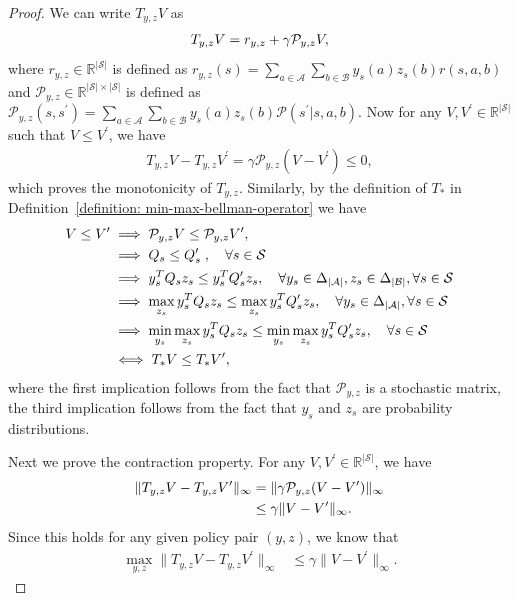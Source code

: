 \documentclass{article}
\theoremstyle{plain}
\theoremstyle{definition}
\theoremstyle{remark}
\def\cA{\mathcal A}
\def\cB{\mathcal B}
\def\cP{\mathcal P}
\begin{document}
\begin{proof}
    We can write $T_{y,z} V$ as
    \begin{align}
        T_{y,z} V = r_{y,z} + \gamma \cP_{y,z} V,\notag
    \end{align}
    where $r_{y,z} \in \mathbb{R}^{|\mathcal{S}|}$ is defined as $r_{y,z}(s) = \sum_{a\in \mathcal{A}} \sum_{b\in \mathcal{B}} y_s(a) z_s(b) r(s,a,b)$ and $\cP_{y,z} \in \mathbb{R}^{|\mathcal{S}| \times |\mathcal{S}|}$ is defined as $\cP_{y,z}(s,s^\prime) = \sum_{a\in \mathcal{A}} \sum_{b\in \mathcal{B}} y_s(a) z_s(b) \cP(s^\prime|s,a,b)$.
    Now for any $V, V^\prime \in \mathbb{R}^{|\mathcal{S}|}$ such that $V \le V^\prime$, we have 
    \begin{align}
        T_{y,z} V - T_{y,z} V^\prime= \gamma \cP_{y,z} (V - V^\prime) \le 0,
    \end{align}
    which proves the monotonicity of $T_{y,z}$.
    Similarly, by the definition of $T_{*}$ in Definition~\ref{definition: min-max-bellman-operator} we have
    \begin{align}
        V \le V^\prime & \implies \cP_{y,z} V \le \cP_{y,z} V^\prime,   \notag\\
        & \implies Q_s \le Q_s^\prime \; , \quad \forall s\in \mathcal{S} \notag\\
        & \implies y_s^T Q_s z_s \le y_s^T Q_s^\prime z_s, \quad \forall y_s \in \Delta_{|\cA|}, z_s \in \Delta_{|\cB|}, \forall s\in \mathcal{S} \notag\\
        & \implies \max_{z_s} y_s^T Q_s z_s \le \max_{z_s} y_s^T Q_s^\prime z_s, \quad \forall y_s \in \Delta_{|\cA|}, \forall s\in \mathcal{S} \notag\\
        & \implies \min_{y_s} \max_{z_s} y_s^T Q_s z_s \le \min_{y_s} \max_{z_s} y_s^T Q_s^\prime z_s, \quad \forall s\in \mathcal{S} \notag\\
        & \iff T_{*} V \le T_{*} V^\prime,
    \end{align}
    where the first implication follows from the fact that $\cP_{y,z}$ is a stochastic matrix, the third implication follows from the fact that $y_s$ and $z_s$ are probability distributions.

    Next we prove the contraction property.
    For any $V, V^\prime \in \mathbb{R}^{|\mathcal{S}|}$, we have
    \begin{align}
        \|T_{y,z} V - T_{y,z} V^\prime\|_\infty & = \| \gamma \cP_{y,z} (V - V^\prime) \|_\infty \notag\\
        & \le \gamma \| V - V^\prime \|_\infty.
    \end{align}
    Since this holds for any given policy pair $(y,z)$, we know that 
    \begin{align}
        \max_{y,z} \|T_{y,z} V - T_{y,z} V^\prime\|_\infty & \le \gamma \| V - V^\prime \|_\infty.
    \end{align}


\end{proof}
\end{document}
